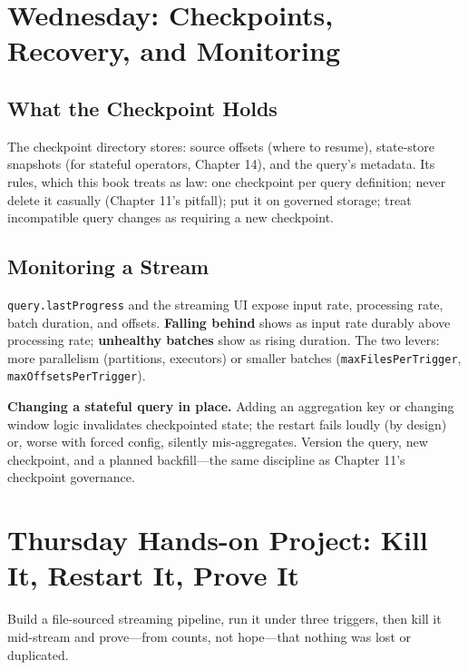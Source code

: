\section{Wednesday: Checkpoints, Recovery, and Monitoring}
\subsection{What the Checkpoint Holds}
The checkpoint directory stores: source offsets (where to resume), state-store snapshots (for stateful operators, Chapter 14), and the query's metadata. Its rules, which this book treats as law: one checkpoint per query definition; never delete it casually (Chapter 11's pitfall); put it on governed storage; treat incompatible query changes as requiring a new checkpoint.

\subsection{Monitoring a Stream}
\texttt{query.lastProgress} and the streaming UI expose input rate, processing rate, batch duration, and offsets. \textbf{Falling behind} shows as input rate durably above processing rate; \textbf{unhealthy batches} show as rising duration. The two levers: more parallelism (partitions, executors) or smaller batches (\texttt{maxFilesPerTrigger}, \texttt{maxOffsetsPerTrigger}).

\begin{pitfall}
\textbf{Changing a stateful query in place.} Adding an aggregation key or changing window logic invalidates checkpointed state; the restart fails loudly (by design) or, worse with forced config, silently mis-aggregates. Version the query, new checkpoint, and a planned backfill---the same discipline as Chapter 11's checkpoint governance.
\end{pitfall}

\section{Thursday Hands-on Project: Kill It, Restart It, Prove It}
Build a file-sourced streaming pipeline, run it under three triggers, then kill it mid-stream and prove---from counts, not hope---that nothing was lost or duplicated.

